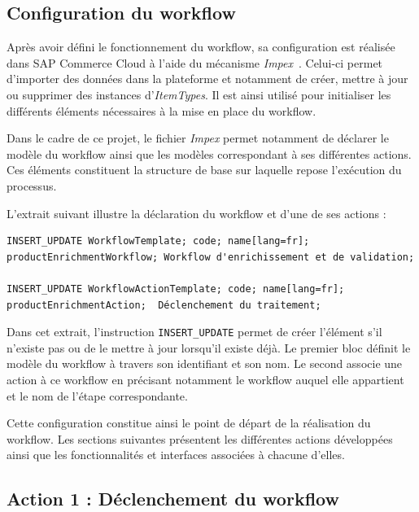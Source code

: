 \subsection{Configuration du workflow}

Après avoir défini le fonctionnement du workflow, sa configuration est réalisée dans SAP Commerce Cloud à l'aide du mécanisme \textit{Impex}~. Celui-ci permet d'importer des données dans la plateforme et notamment de créer, mettre à jour ou supprimer des instances d'\textit{ItemTypes}. Il est ainsi utilisé pour initialiser les différents éléments nécessaires à la mise en place du workflow.

Dans le cadre de ce projet, le fichier \textit{Impex} permet notamment de déclarer le modèle du workflow ainsi que les modèles correspondant à ses différentes actions. Ces éléments constituent la structure de base sur laquelle repose l'exécution du processus.

L'extrait suivant illustre la déclaration du workflow et d'une de ses actions :

\begin{tcolorbox}[
colback=gray!5,
colframe=gray!60,
title=\textbf{Extrait de la configuration Impex du workflow},
fonttitle=\small,
coltitle=black,
boxrule=0.6pt,
arc=2mm,
left=3mm,
right=3mm,
top=2mm,
bottom=2mm
]
\begin{verbatim}
INSERT_UPDATE WorkflowTemplate; code; name[lang=fr];
productEnrichmentWorkflow; Workflow d'enrichissement et de validation;

INSERT_UPDATE WorkflowActionTemplate; code; name[lang=fr];
productEnrichmentAction;  Déclenchement du traitement;
\end{verbatim}
\end{tcolorbox}

Dans cet extrait, l'instruction \verb|INSERT_UPDATE| permet de créer l'élément s'il n'existe pas ou de le mettre à jour lorsqu'il existe déjà. Le premier bloc définit le modèle du workflow à travers son identifiant et son nom. Le second associe une action à ce workflow en précisant notamment le workflow auquel elle appartient et le nom de l'étape correspondante.

Cette configuration constitue ainsi le point de départ de la réalisation du workflow. Les sections suivantes présentent les différentes actions développées ainsi que les fonctionnalités et interfaces associées à chacune d'elles.

\subsection{Action 1 : Déclenchement du workflow}

